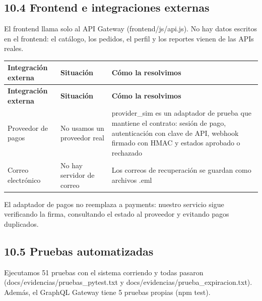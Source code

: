 \documentclass[10pt,letterpaper]{article}
\begin{document}
\subsection*{10.4 Frontend e integraciones externas}
El frontend llama solo al API Gateway (frontend/\allowbreak{}js/\allowbreak{}api.\allowbreak{}js). No hay datos escritos en el frontend: el catálogo, los pedidos, el perfil y los reportes vienen de las APIs reales.

{\footnotesize
\begin{longtable}{|P{\tabcolsep\relax}|P{\tabcolsep\relax}|P{\tabcolsep\relax}|}
\hline
\textbf{Integración externa} & \textbf{Situación} & \textbf{Cómo la resolvimos} \\ \hline
\endfirsthead
\hline
\textbf{Integración externa} & \textbf{Situación} & \textbf{Cómo la resolvimos} \\ \hline
\endhead
Proveedor de pagos & No usamos un proveedor real & provider\_\allowbreak{}sim es un adaptador de prueba que mantiene el contrato: sesión de pago, autenticación con clave de API, webhook firmado con HMAC y estados aprobado o rechazado \\ \hline
Correo electrónico & No hay servidor de correo & Los correos de recuperación se guardan como archivos .eml \\ \hline
\end{longtable}}
El adaptador de pagos no reemplaza a payments: nuestro servicio sigue verificando la firma, consultando el estado al proveedor y evitando pagos duplicados.


\subsection*{10.5 Pruebas automatizadas}
Ejecutamos 51 pruebas con el sistema corriendo y todas pasaron (docs/\allowbreak{}evidencias/\allowbreak{}pruebas\_\allowbreak{}pytest.\allowbreak{}txt y docs/\allowbreak{}evidencias/\allowbreak{}prueba\_\allowbreak{}expiracion.\allowbreak{}txt). Además, el GraphQL Gateway tiene 5 pruebas propias (npm test).
\end{document}
